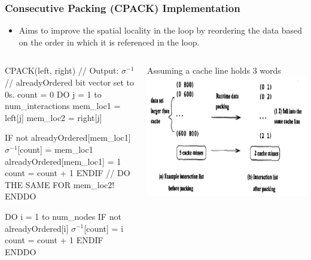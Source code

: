 \documentclass{beamer}
\newcommand{\emphh}[1]{\textcolor{CosGreen}{ #1}}
\newcommand{\mymath}[1]{$ #1 $}
\newcommand{\myindx}[1]{_{#1}}
\newcommand{\myindu}[1]{^{#1}}
\begin{document}
\begin{frame}[fragile,t]
  \frametitle{Consecutive Packing (CPACK) Implementation}

\begin{itemize}
    \item Aims to improve the \emphh{spatial locality} in the loop
            by reordering the data based on the order in which it is
            referenced in the loop.
\end  {itemize}


\begin{columns}
\begin{colorcode}
CPACK(left, right)  // Output: \mymath{\sigma\myindu{-1}}
// alreadyOrdered bit vector set to 0s.
count = 0
DO j = 1 to num_interactions
  mem_loc1 =  left[j]
  mem_loc2 = right[j]
  
  IF not alreadyOrdered[mem_loc1]
    \mymath{\sigma\myindu{-1}}[count] = mem_loc1
    alreadyOrdered[mem_loc1] = 1
    count = count + 1
  ENDIF
  // DO THE SAME FOR mem_loc2!
ENDDO
    
DO i = 1 to num_nodes
  IF not alreadyOrdered[i]
    \mymath{\sigma\myindu{-1}}[count] = i
    count = count + 1
ENDIF ENDDO
\end{colorcode}
Assuming a cache line holds 3 words
\includegraphics[width=35ex]{Figures/CacheMissesEg}
\end{columns}
 

\end{frame}
\end{document}
